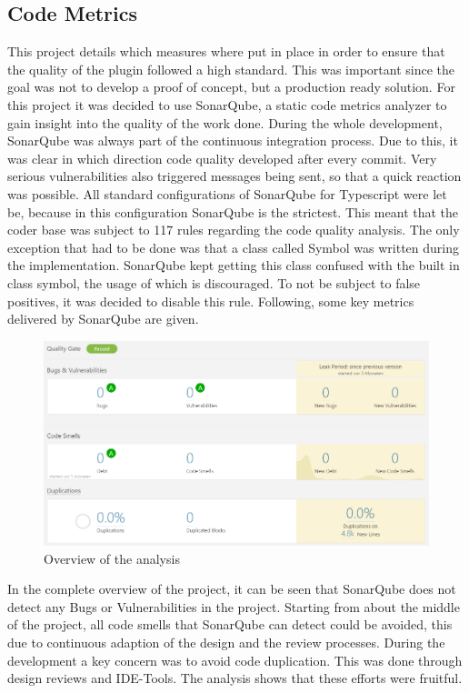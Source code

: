 \subsection{Code Metrics}
This project details which measures where put in place in order to ensure that the quality of the plugin followed a high standard. This was important since the goal was not to develop a proof of concept, but a production ready solution. For this project it was decided to use SonarQube, a static code metrics analyzer to gain insight into the quality of the work done.\newline
During the whole development, SonarQube was always part of the continuous integration process. Due to this, it was clear in which direction code quality developed after every commit. Very serious vulnerabilities also triggered messages being sent, so that a quick reaction was possible. \newline
All standard configurations of SonarQube for Typescript were let be, because in this configuration SonarQube is the strictest. This meant that the coder base was subject to 117 rules regarding the code quality analysis. The only exception that had to be done was that a class called Symbol was written during the implementation. SonarQube kept getting this class confused with the built in class symbol, the usage of which is discouraged. To not be subject to false positives, it was decided to disable this rule.\newline
Following, some key metrics delivered by SonarQube are given.\newline
\begin{figure}[H]
	\centering
	\includegraphics[width=1\textwidth]{img/sonarAll}
	\caption{Overview of the analysis}
	\label{fig:sonarQubeOverview}
\end{figure}
In the complete overview of the project, it can be seen that SonarQube does not detect any Bugs or Vulnerabilities in the project. Starting from about the middle of the project, all code smells that SonarQube can detect could be avoided, this due to continuous adaption of the design and the review processes. During the development a key concern was to avoid code duplication. This was done through design reviews and IDE-Tools. The analysis shows that these efforts were fruitful.\newline
